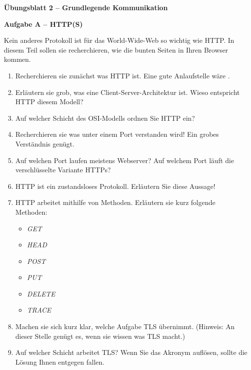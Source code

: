 \documentclass[paper=a4,fontsize=11pt]{scrartcl}%
\numberwithin{equation}{section}
\begin{document}
\begin{center}
\Large{\textbf{Übungsblatt 2 -- Grundlegende Kommunikation}}
\end{center}

\begin{center}\Large{\textbf{Aufgabe A -- HTTP(S)}}\end{center}\vskip0.25in
Kein anderes Protokoll ist für das World-Wide-Web so wichtig wie HTTP. In diesem Teil sollen sie recherchieren, wie die bunten Seiten in Ihren Browser kommen.
\begin{enumerate}
	\item Recherchieren sie zunächst was HTTP ist. Eine gute Anlaufstelle wäre \cite[S. 98ff]{Kurose2012}.
	\item Erläutern sie grob, was eine Client-Server-Architektur ist. Wieso entspricht HTTP diesem Modell?
	\item Auf welcher Schicht des OSI-Modells ordnen Sie HTTP ein?
	\item Recherchieren sie was unter einem Port verstanden wird! Ein grobes Verständnis genügt.
	\item Auf welchen Port laufen meistens Webserver? Auf welchem Port läuft die verschlüsselte Variante HTTPs?
	\item HTTP ist ein zustandsloses Protokoll. Erläutern Sie diese Aussage!
	\item HTTP arbeitet mithilfe von Methoden. Erläutern sie kurz folgende Methoden:
	\begin{itemize}
		\item \emph{GET}
		\item \emph{HEAD}
		\item \emph{POST}
		\item \emph{PUT}
		\item \emph{DELETE}
		\item \emph{TRACE}
	\end{itemize}
	\item Machen sie sich kurz klar, welche Aufgabe TLS übernimmt. (Hinweis: An dieser Stelle genügt es, wenn sie wissen was TLS macht.)
	\item Auf welcher Schicht arbeitet TLS? Wenn Sie das Akronym auflösen, sollte die Lösung Ihnen entgegen fallen.
\end{enumerate}





\printbibliography
\end{document}
